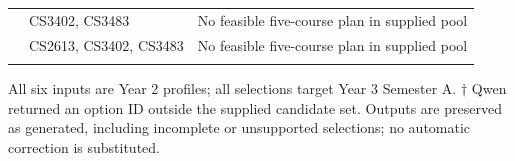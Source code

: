 \documentclass{article}
\begin{document}
{\begin{longtable}{p{2.45in}p{1.35in}p{1.35in}}
\addlinespace[3pt]
{\raggedright \textbf{CS2; CS.} Passed: CS1302A, CS2115, CS2310, CS2312, CS2402, CS3103, CS3201, CS3334, GE1401, GE1501, GE1601, GE2340, MA1503, MA1508, MA2185. \textit{Preference:} Artificial Intelligence.\par} & {\raggedright CS3402, CS3483\par} & {\raggedright No feasible five-course plan in supplied pool\par}\\
\addlinespace[3pt]
{\raggedright \textbf{CS3; CS.} Passed: CS1302A, CS2115, CS2310, CS2312, CS2402, CS3103, CS3201, CS3334, CS3342, GE1401, GE1501, GE1601, GE2340, MA1503, MA1508, MA2185. \textit{Preference:} Data Science.\par} & {\raggedright CS2613, CS3402, CS3483\par} & {\raggedright No feasible five-course plan in supplied pool\par}\\
\addlinespace[3pt]
\end{longtable}
}

\noindent\footnotesize All six inputs are Year 2 profiles; all selections target Year 3 Semester A. $\dagger$ Qwen returned an option ID outside the supplied candidate set. Outputs are preserved as generated, including incomplete or unsupported selections; no automatic correction is substituted.\normalsize
\end{document}
